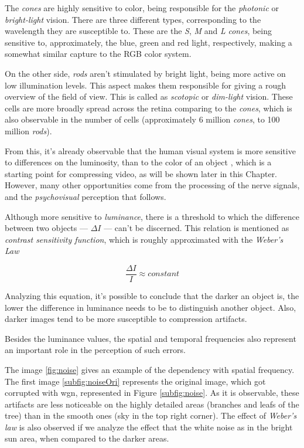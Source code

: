 The \emph{cones} are highly sensitive to color, being responsible for the \emph{photonic} or \emph{bright-light} vision. There are three different types, corresponding to the wavelength they are susceptible to. These are the \emph{S}, \emph{M} and \emph{L} \emph{cones}, being sensitive to, approximately, the blue, green and red light, respectively, making a somewhat similar capture to the RGB color system.

On the other side, \emph{rods} aren't stimulated by bright light, being more active on low illumination levels. This aspect makes them responsible for giving a rough overview of the field of view. This is called as \emph{scotopic} or \emph{dim-light} vision. These cells are more broadly spread across the retina comparing to the \emph{cones}, which is also observable in the number of cells (approximately 6 million \emph{cones}, to 100 million \emph{rods}).

From this, it's already observable that the human visual system is more sensitive to differences on the luminosity, than to the color of an object \cite{mullenContrastSensitivityHuman1985}, which is a starting point for compressing video, as will be shown later in this Chapter. However, many other opportunities come from the processing of the nerve signals, and the \emph{psychovisual} perception that follows.

Although more sensitive to \emph{luminance}, there is a threshold to which the difference between two objects --- $\Delta I$ --- can't be discerned. This relation is mentioned as \emph{contrast sensitivity function}, which is roughly approximated with the \emph{Weber's Law}

\begin{equation}
    \frac{\Delta I}{I}\approx constant
\end{equation}

Analyzing this equation, it's possible to conclude that the darker an object is, the lower the difference in luminance needs to be to distinguish another object. Also, darker images tend to be more susceptible to compression artifacts.

Besides the luminance values, the spatial and temporal frequencies also represent an important role in the perception of such errors. 

The image \ref{fig:noise} gives an example of the dependency with spatial frequency. The first image \ref{subfig:noiseOri} represents the original image, which got corrupted with \gls{wgn}, represented in Figure \ref{subfig:noise}. As it is observable, these artifacts are less noticeable on the highly detailed areas (branches and leafs of the tree) than in the smooth ones (sky in the top right corner). The effect of \emph{Weber's law} is also observed if we analyze the effect that the white noise as in the bright sun area, when compared to the darker areas.

